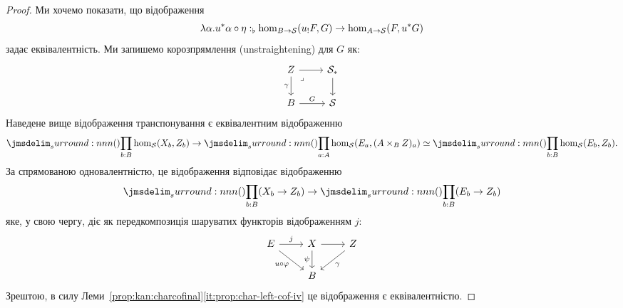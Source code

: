 \documentclass[12pt]{article}
\newcommand{\Space}{\mathcal{S}}
\newcommand{\GM}{\flat}
\let\prn\DelimPrn
\begin{document}
\begin{proof}
  Ми хочемо показати, що відображення
  \[ \DeclVar{\lambda \alpha.u^*\alpha \circ \eta}{\GM}{\hom_{B \to \Space}(u_!F, G) \to \hom_{A \to \Space}(F, u^*G)}\]
  задає еквівалентність. Ми запишемо корозпрямлення (unstraightening) для $G$ як:
  \[\begin{tikzcd}
	Z & {\Space_*} \\
	B & \Space
	\arrow[from=1-1, to=1-2]
	\arrow["\gamma"', from=1-1, to=2-1]
	\arrow["\lrcorner"{anchor=center, pos=0.125}, draw=none, from=1-1, to=2-2]
	\arrow[from=1-2, to=2-2]
	\arrow["G", from=2-1, to=2-2]
  \end{tikzcd}\]
  Наведене вище відображення транспонування є еквівалентним відображенню
  \[ \prn{\prod_{b:B} \hom_\Space(X_b, Z_b)} \to \prn{\prod_{a:A} \hom_\Space(E_a, (A \times_B Z)_a)} \simeq \prn{\prod_{b:B} \hom_\Space(E_b,Z_b)}.\]
  За спрямованою одновалентністю, це відображення відповідає відображенню
  \[ \prn{\prod_{b:B} (X_b \to Z_b)} \to\prn{\prod_{b:B} (E_b \to Z_b)} \]
  яке, у свою чергу, діє як передкомпозиція шаруватих функторів відображенням $j$:
  \[\begin{tikzcd}
	E & X & Z \\
	& B
	\arrow["j", from=1-1, to=1-2]
	\arrow["{u \circ \varphi}"', from=1-1, to=2-2]
	\arrow[from=1-2, to=1-3]
	\arrow["\psi"', from=1-2, to=2-2]
	\arrow["\gamma", from=1-3, to=2-2]
\end{tikzcd}\]
Зрештою, в силу Леми~\ref{prop:kan:charcofinal}\ref{it:prop:char-left-cof-iv} це відображення є еквівалентністю.
\end{proof}
\end{document}
